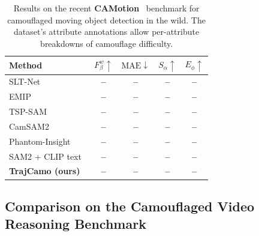 \documentclass[11pt]{article}
\newcommand{\TBD}{\textcolor{red!70!black}{\textbf{--}}}
\begin{document}
\begin{table}[t]
\centering
\caption{Results on the recent \textbf{CAMotion}~\cite{camotion} benchmark for camouflaged moving object detection in the wild. The dataset's attribute annotations allow per-attribute breakdowns of camouflage difficulty.}
\label{tab:camotion}
\small
\setlength{\tabcolsep}{4pt}
\begin{tabular}{lcccc}
\toprule
Method & $F^w_\beta\uparrow$ & $\mathrm{MAE}\downarrow$ & $S_\alpha\uparrow$ & $E_\phi\uparrow$ \\
\midrule
SLT-Net~\cite{sltnet}            & \TBD & \TBD & \TBD & \TBD \\
EMIP~\cite{emip}                 & \TBD & \TBD & \TBD & \TBD \\
TSP-SAM~\cite{tspsam}            & \TBD & \TBD & \TBD & \TBD \\
CamSAM2~\cite{camsam2}           & \TBD & \TBD & \TBD & \TBD \\
Phantom-Insight~\cite{phantominsight} & \TBD & \TBD & \TBD & \TBD \\
SAM2 + CLIP text~\cite{sam2}     & \TBD & \TBD & \TBD & \TBD \\
\midrule
\textbf{TrajCamo (ours)}         & \TBD & \TBD & \TBD & \TBD \\
\bottomrule
\end{tabular}
\end{table}

\subsection{Comparison on the Camouflaged Video Reasoning Benchmark}
\end{document}
